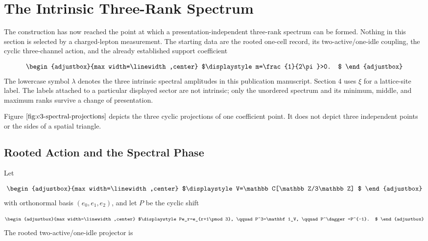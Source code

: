\section{The Intrinsic Three-Rank Spectrum}
\label{sec:12}
The construction has now reached the point at which a presentation-independent three-rank spectrum can be formed. Nothing in this section is selected by a charged-lepton measurement. The starting data are the rooted one-cell record, its two-active/one-idle coupling, the cyclic three-channel action, and the already established support coefficient

\begin{equation*}
\begin{adjustbox}{max width=\linewidth,center}
$\displaystyle
m=\frac{1}{2\pi}>0.
$
\end{adjustbox}
\end{equation*}
The lowercase symbol \(\lambda\) denotes the three intrinsic spectral amplitudes in this publication manuscript. Section 4 uses \(\xi\) for a lattice-site label. The labels attached to a particular displayed sector are not intrinsic; only the unordered spectrum and its minimum, middle, and maximum ranks survive a change of presentation.

Figure \(\ref{fig:c3-spectral-projections}\) depicts the three cyclic projections of one coefficient point.  It does not depict three independent points or the sides of a spatial triangle.

\subsection{Rooted Action and the Spectral Phase}
Let

\begin{equation*}
\begin{adjustbox}{max width=\linewidth,center}
$\displaystyle
V=\mathbb C[\mathbb Z/3\mathbb Z]
$
\end{adjustbox}
\end{equation*}
with orthonormal basis \((e_0,e_1,e_2)\), and let \(P\) be the cyclic shift

\begin{equation*}
\begin{adjustbox}{max width=\linewidth,center}
$\displaystyle
Pe_r=e_{r+1\pmod 3},
\qquad
P^3=\mathbf1_V,
\qquad
P^\dagger=P^{-1}.
$
\end{adjustbox}
\end{equation*}
The rooted two-active/one-idle projector is

